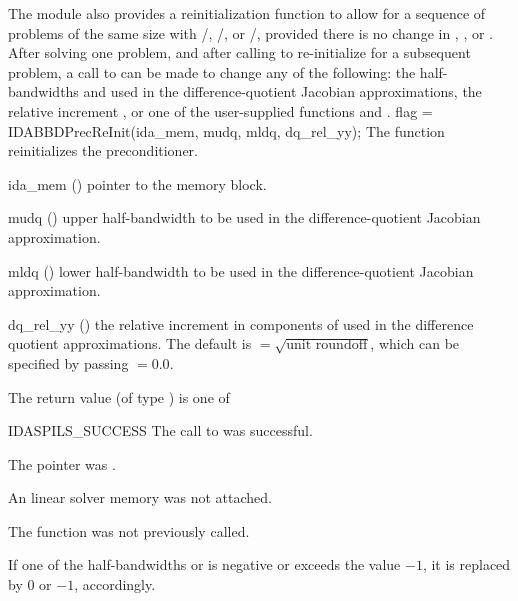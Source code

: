 {The {\idabbdpre} module also provides a reinitialization function to allow
for a sequence of problems of the same size with {\idaspgmr}/{\idabbdpre},
{\idaspbcg}/{\idabbdpre}, or {\idasptfqmr}/{\idabbdpre}, provided there is no
change in , , or .
After solving one problem, and after calling  to re-initialize 
{\idas} for a subsequent problem, a call to  can be made
to change any of the following: the half-bandwidths  and  
used in the difference-quotient Jacobian approximations, the relative increment 
, or one of the user-supplied functions  and .
{
  flag = IDABBDPrecReInit(ida\_mem, mudq, mldq, dq\_rel\_yy);
}
{
  The function  reinitializes the {\idabbdpre} preconditioner.
}
{
  \begin{args}[dq\_rel\_yy]
  \item[ida\_mem] ()
    pointer to the {\idas} memory block.
  \item[mudq] ()
    upper half-bandwidth to be used in the difference-quotient Jacobian approximation.
  \item[mldq] ()
    lower half-bandwidth to be used in the difference-quotient Jacobian approximation.
  \item[dq\_rel\_yy] ()
    the relative increment in components of  used in the difference quotient
    approximations.  
    The default is  $= \sqrt{\text{unit roundoff}}$, which
    can be specified by passing  $= 0.0$.
  \end{args}
}
{
  The return value  (of type ) is one of
  \begin{args}
  \item[IDASPILS\_SUCCESS]
    The call to  was successful.
  \item[\id{IDASPILS\_MEM\_NULL}] 
    The  pointer was .
  \item[\Id{IDASPILS\_LMEM\_NULL}]
    An {\idaspils} linear solver memory was not attached.
  \item[\Id{IDASPILS\_PMEM\_NULL}]
    The function  was not previously called.
  \end{args}
}
{
  If one of the half-bandwidths  or  is negative or
  exceeds the value $-1$, it is replaced by 0 or $-1$,
  accordingly.
}}
